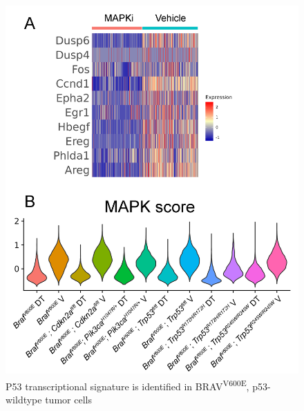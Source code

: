 \begin{figure}
\hypertarget{fig:04}{%
\centering
\includegraphics[width=1\textwidth,height=\textheight]{images/scrna_5.png}
\caption{P53 transcriptional signature is identified in BRAV\textsuperscript{V600E}, p53-wildtype tumor cells}\label{fig:04}
}
\end{figure}

